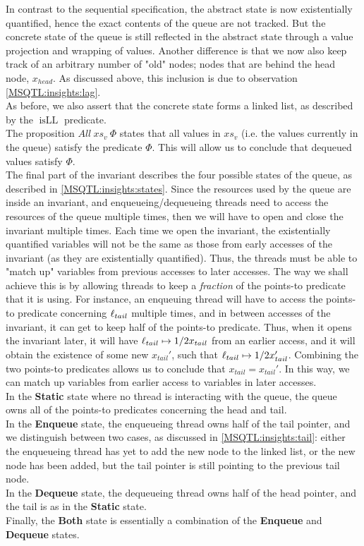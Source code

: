 \documentclass[twoside,11pt,openright]{report}
\newcommand{\isLL}{\operatorname{isLL}}
\newcommand{\StaticState}{\textbf{Static}}
\newcommand{\EnqueueState}{\textbf{Enqueue}}
\newcommand{\DequeueState}{\textbf{Dequeue}}
\newcommand{\BothState}{\textbf{Both}}
\begin{document}
In contrast to the sequential specification, the abstract state is now existentially quantified, hence the exact contents of the queue are not tracked. But the concrete state of the queue is still reflected in the abstract state through a value projection and wrapping of values. Another difference is that we now also keep track of an arbitrary number of "old" nodes; nodes that are behind the head node, $x_{head}$. As discussed above, this inclusion is due to observation \ref{MSQTL:insights:lag}.\\
As before, we also assert that the concrete state forms a linked list, as described by the $\isLL$ predicate.\\
The proposition $All \ xs_v \ \Phi$ states that all values in $xs_v$ (i.e. the values currently in the queue) satisfy the predicate $\Phi$. This will allow us to conclude that dequeued values satisfy $\Phi$.\\
The final part of the invariant describes the four possible states of the queue, as described in \ref{MSQTL:insights:states}. Since the resources used by the queue are inside an invariant, and enqueueing/dequeueing threads need to access the resources of the queue multiple times, then we will have to open and close the invariant multiple times. Each time we open the invariant, the existentially quantified variables will not be the same as those from early accesses of the invariant (as they are existentially quantified). Thus, the threads must be able to "match up" variables from previous accesses to later accesses. The way we shall achieve this is by allowing threads to keep a \textit{fraction} of the points-to predicate that it is using. For instance, an enqueuing thread will have to access the points-to predicate concerning $\ell_{tail}$ multiple times, and in between accesses of the invariant, it can get to keep half of the points-to predicate. Thus, when it opens the invariant later, it will have $\ell_{tail} \mapsto{1/2} x_{tail}$ from an earlier access, and it will obtain the existence of some new $x_{tail}'$, such that $\ell_{tail} \mapsto{1/2} x_{tail}'$. Combining the two points-to predicates allows us to conclude that $x_{tail} = x_{tail}'$. In this way, we can match up variables from earlier access to variables in later accesses.\\
In the \StaticState{} state where no thread is interacting with the queue, the queue owns all of the points-to predicates concerning the head and tail.\\
In the \EnqueueState{} state, the enqueueing thread owns half of the tail pointer, and we distinguish between two cases, as discussed in \ref{MSQTL:insights:tail}: either the enqueueing thread has yet to add the new node to the linked list, or the new node has been added, but the tail pointer is still pointing to the previous tail node.\\
In the \DequeueState{} state, the dequeueing thread owns half of the head pointer, and the tail is as in the \StaticState{} state.\\
Finally, the \BothState{} state is essentially a combination of the \EnqueueState{} and \DequeueState{} states.
\end{document}
